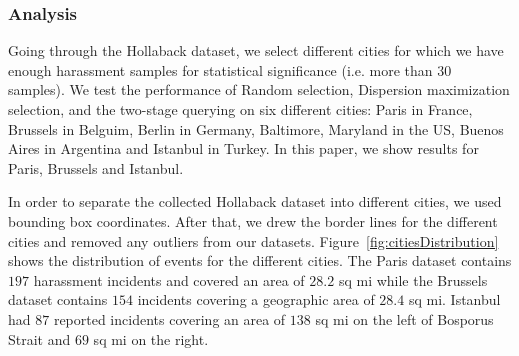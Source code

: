 \documentclass{acm_proc_article-sp}
\begin{document}
\subsubsection{Analysis}
Going through the Hollaback dataset, we select different cities for which we have enough harassment samples for statistical significance (i.e. more than 30 samples). We test the performance of Random selection, Dispersion maximization selection, and the two-stage querying on six different cities: Paris in France, Brussels in Belguim, Berlin in Germany, Baltimore, Maryland in the US, Buenos Aires in Argentina and Istanbul in Turkey. In this paper, we show results for Paris, Brussels and Istanbul. \par

In order to separate the collected Hollaback dataset into different cities, we used bounding box coordinates. After that, we drew the border lines for the different cities and removed any outliers from our datasets. Figure~\ref{fig:citiesDistribution} shows the distribution of events for the different cities. The Paris dataset contains $197$ harassment incidents and covered an area of $28.2$ sq mi while the Brussels dataset contains $154$ incidents covering a geographic area of $28.4$ sq mi. Istanbul had $87$ reported incidents covering an area of $138$ sq mi on the left of Bosporus Strait and $69$ sq mi on the right. \par
\end{document}
